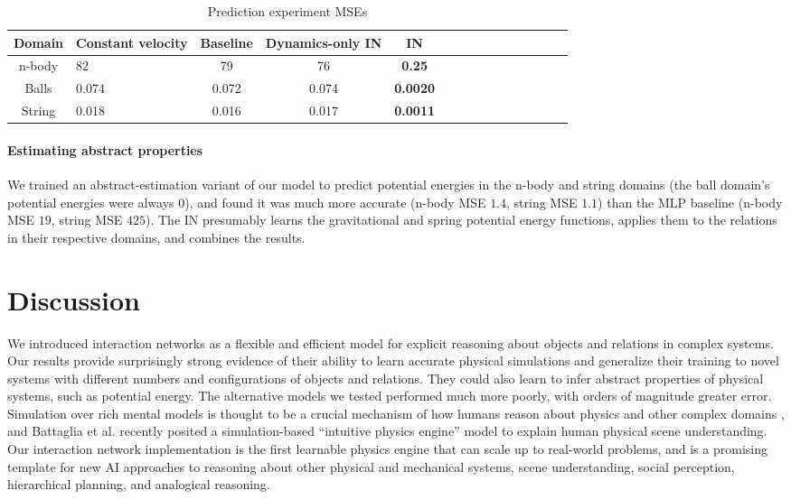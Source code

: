 \documentclass{article}
\begin{document}
\begin{table}[t]
  \caption{Prediction experiment MSEs}
  \label{tab:mse}
  \centering
  \begin{tabular}{clccccccccccccc}
    \toprule
    Domain & Constant velocity & Baseline & Dynamics-only IN & IN \\
    \midrule
    n-body & 82 & 79 & 76 & \textbf{0.25} \\
    Balls & 0.074 & 0.072 & 0.074 & \textbf{0.0020} \\
    String & 0.018 & 0.016 & 0.017 & \textbf{0.0011} \\
    \bottomrule
  \end{tabular}
\end{table}


\paragraph{Estimating abstract properties}
We trained an abstract-estimation variant of our model to predict
potential energies in the n-body and string domains (the ball domain's
potential energies were always $0$), and found it was much more
accurate (n-body MSE $1.4$, string MSE $1.1$) than the MLP baseline
(n-body MSE $19$, string MSE $425$). The IN presumably learns the
gravitational and spring potential energy functions, applies them to
the relations in their respective domains, and combines the results.


\section{Discussion}
We introduced interaction networks as a flexible and efficient model
for explicit reasoning about objects and relations in complex
systems. Our results provide surprisingly strong evidence of their
ability to learn accurate physical simulations and generalize their
training to novel systems with different numbers and configurations of
objects and relations. They could also learn to infer abstract
properties of physical systems, such as potential energy. The
alternative models we tested performed much more poorly, with orders
of magnitude greater error. Simulation over rich mental models is
thought to be a crucial mechanism of how humans reason about physics
and other complex domains
\cite{craik1943nature,johnson1983mental,hegarty2004mechanical}, and
Battaglia et al. \cite{battaglia2013simulation} recently posited a
simulation-based ``intuitive physics engine'' model to explain human
physical scene understanding. Our interaction network implementation
is the first learnable physics engine that can scale up to real-world
problems, and is a promising template for new AI approaches to
reasoning about other physical and mechanical systems, scene
understanding, social perception, hierarchical planning, and
analogical reasoning.
\end{document}
